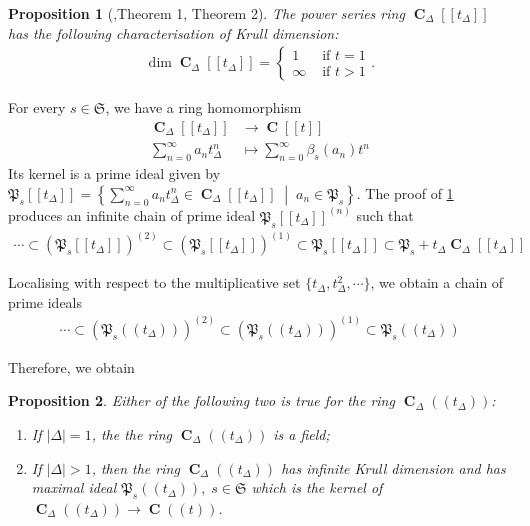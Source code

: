 \documentclass{amsart}
\newtheorem{proposition}{Proposition}[section]
\DeclareMathOperator{\C}{\textbf{C}}
\begin{document}
\begin{proposition}[\cite{Powerseriesdim},Theorem 1, Theorem 2]\label{Power Series dim}
    The power series ring $\C_\Delta[\![t_\Delta]\!]$ has the following characterisation of Krull dimension:
    \begin{align*}
        \dim\C_\Delta[\![t_\Delta]\!]=
        \begin{cases}
            1 & \text{ if } t=1\\
            \infty & \text{ if }t>1
        \end{cases}.
    \end{align*}
\end{proposition}

For every $s\in\mathfrak{S}$, we have a ring homomorphism
\begin{align*}
    \C_\Delta[\![t_\Delta]\!]&\to \C[\![t]\!]\\
     \sum\limits_{n=0}^\infty a_nt^n_\Delta&\mapsto \sum\limits_{n=0}^\infty \beta_s(a_n)t^n
\end{align*}
Its kernel is a prime ideal given by $\mathfrak{P}_s[\![t_\Delta]\!]=\left\{\sum\limits_{n=0}^\infty a_nt^n_\Delta\in\C_\Delta[\![t_\Delta]\!]\;\middle|\; a_n\in\mathfrak{P}_s\right\}$. The proof of \ref{Power Series dim} produces an infinite chain of prime ideal $\mathfrak{P}_s[\![t_\Delta]\!]^{(n)}$ such that
\begin{align*}
    \cdots\subset(\mathfrak{P}_s[\![t_\Delta]\!])^{(2)}\subset(\mathfrak{P}_s[\![t_\Delta]\!])^{(1)}\subset\mathfrak{P}_s[\![t_\Delta]\!]\subset \mathfrak{P}_s+t_\Delta\C_\Delta[\![t_\Delta]\!]
\end{align*}

Localising with respect to the multiplicative set $\{t_\Delta,t^2_\Delta,\cdots\}$, we obtain a chain of prime ideals 
\begin{align*}
    \cdots\subset (\mathfrak{P}_s(\!(t_\Delta)\!))^{(2)}\subset (\mathfrak{P}_s(\!(t_\Delta)\!))^{(1)}\subset \mathfrak{P}_s(\!(t_\Delta)\!)
\end{align*}

Therefore, we obtain

\begin{proposition}\label{Hodge-Tate Period rings are infinite dimensional}
    Either of the following two is true for the ring $\C_\Delta(\!(t_\Delta)\!)$:
    \begin{enumerate}
        \item[(i)] If $|\Delta|=1$, the the ring $\C_\Delta(\!(t_\Delta)\!)$ is a field;
        \item[(ii)] If $|\Delta|>1$, then the ring $\C_\Delta(\!(t_\Delta)\!)$ has infinite Krull dimension and has maximal ideal $\mathfrak{P}_s(\!(t_\Delta)\!),\;s\in\mathfrak{S}$ which is the kernel of $\C_\Delta(\!(t_\Delta)\!)\to \C(\!(t)\!)$.
    \end{enumerate}
\end{proposition}
\end{document}
